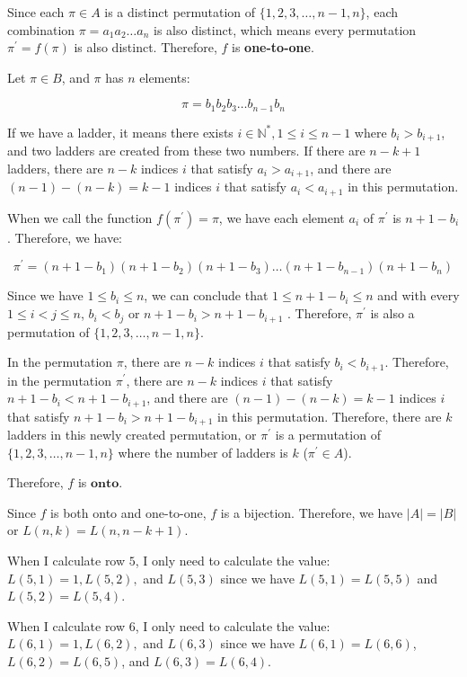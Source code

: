 \documentclass[10pt]{article}
\begin{document}
\begin{enumerate}
\begin{enumerate}
    Since each $\pi \in A$ is a distinct permutation of $\{1,2,3,\ldots,n-1,n\}$, each combination $\pi=a_1a_2\ldots a_n$ is also distinct, which means every permutation $\pi^{'}=f(\pi)$ is also distinct. Therefore, $f$ is \textbf{one-to-one}.

    Let $\pi \in B$, and $\pi$ has $n$ elements:

    $$\pi = b_1b_2b_3\ldots b_{n-1}b_n$$

    If we have a ladder, it means there exists $i \in \mathbb{N}^*, 1 \leq i \leq n - 1$ where $b_i > b_{i+1}$, and two ladders are created from these two numbers. If there are $n-k+1$ ladders, there are $n-k$ indices $i$ that satisfy $a_i > a_{i+1}$, and there are $(n-1) - (n-k) = k-1$ indices $i$ that satisfy $a_i < a_{i+1}$ in this permutation.

    When we call the function $f(\pi^{'})=\pi$, we have each element $a_i$ of $\pi^{'}$ is $n+1-b_i$. Therefore, we have:

    $$\pi^{'} = (n+1-b_1)(n+1-b_2)(n+1-b_3)\ldots (n+1-b_{n-1})(n+1-b_n)$$

    Since we have $1 \leq b_i \leq n$, we can conclude that $1 \leq n+1 - b_i \leq n$ and with every $1 \leq i < j\leq n$, $b_i < b_j$ or $n+1 - b_i > n+1 - b_{i+1} $ . Therefore, $\pi^{'}$ is also a permutation of $\{1,2,3,\ldots,n-1,n\}$.
    
    In the permutation $\pi$, there are $n-k$ indices $i$ that satisfy $b_i < b_{i+1}$. Therefore, in the permutation $\pi^{'}$, there are $n-k$ indices $i$ that satisfy $n + 1 - b_i < n + 1 - b_{i+1}$, and there are $(n-1) - (n-k) = k-1$ indices $i$ that satisfy $n + 1 - b_i > n + 1 - b_{i+1}$ in this permutation. Therefore, there are $k$ ladders in this newly created permutation, or $\pi^{'}$ is a permutation of $\{1,2,3,\ldots,n-1,n\}$ where the number of ladders is $k$ ($\pi^{'} \in A$).

    Therefore, $f$ is $\textbf{onto}$.

    Since $f$ is both onto and one-to-one, $f$ is a bijection. Therefore, we have $|A| = |B|$ or $L(n,k) = L(n, n-k+1)$.
    
    When I calculate row $5$, I only need to calculate the value: $L(5,1)= 1, L(5,2),$ and $L(5,3)$ since we have $L(5,1)=L(5,5)$ and $L(5,2)=L(5,4)$.

     When I calculate row $6$, I only need to calculate the value: $L(6,1)= 1, L(6,2),$ and $L(6,3)$ since we have $L(6,1)=L(6,6)$, $L(6,2)=L(6,5)$, and $L(6,3)=L(6,4)$.
     

\end{enumerate}
\end{enumerate}
\end{document}
